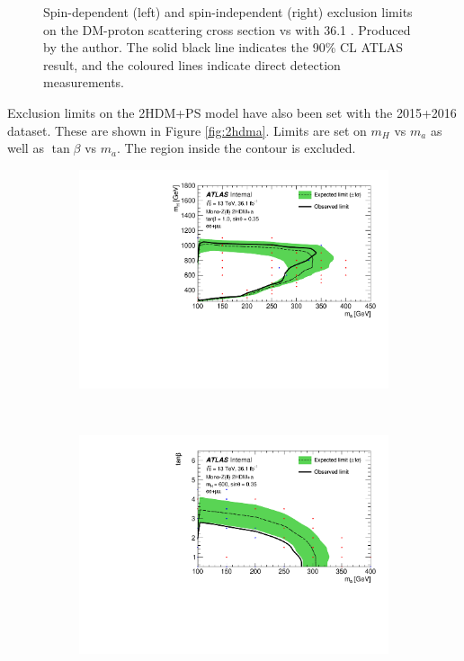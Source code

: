 \begin{figure}[!htb]
\begin{subfigure}[b]{0.48\textwidth}
        \label{fig:xsec_dmV}
    \end{subfigure}
    \caption{Spin-dependent (left) and spin-independent (right) exclusion limits on the DM-proton scattering cross section vs \mmed with 36.1 \ifb \cite{Aaboud:2017bja}. Produced by the author. The solid black line indicates the 90\% CL ATLAS result, and the coloured lines indicate direct detection measurements.}
\label{fig:xsec}
\end{figure}

\clearpage
Exclusion limits on the 2HDM+PS model have also been set with the 2015+2016 dataset. These are shown in Figure \ref{fig:2hdma}. Limits are set on $m_H$ vs $m_a$ as well as $\tan \beta$ vs $m_a$. The region inside the contour is excluded.

\begin{figure}[!htb]
    \centering
    \begin{subfigure}[b]{0.48\textwidth}
        \includegraphics[width=\textwidth]{Figures/limits_2hdma.pdf}
        \label{fig:limits_2hdma}
    \end{subfigure}
    ~ %
    \begin{subfigure}[b]{0.48\textwidth}
        \includegraphics[width=\textwidth]{Figures/limits_2hdma_tan.pdf}

\end{subfigure}
\end{figure}
